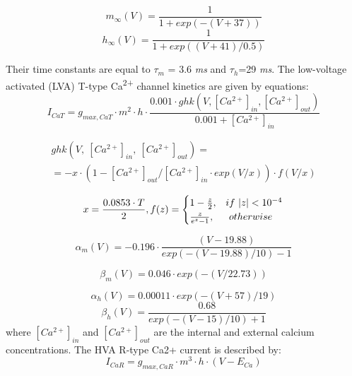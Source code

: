 \documentclass[a4paper,12pt]{article}
\begin{document}
\begin{equation}
m_{\infty}(V)=\frac {1}{1+exp(-(V+37))}
\end{equation}
\begin{equation}
h_{\infty}(V)=\frac {1}{1+exp( (V+41)/0.5)}
\end{equation}

Their time constants are equal to $\tau_m$ = 3.6 \textit{ms} and $\tau_h$=29 \textit{ms}. The low-voltage activated (LVA) T-type Ca\textsuperscript{2+} channel kinetics are given by equations:
\begin{equation}
I_{CaT} = g_{max, CaT}\cdot m^2\cdot h \cdot \frac{0.001 \cdot ghk(V,[Ca^{2+}]_{in},[Ca^{2+}]_{out})}{0.001+[Ca^{2+}]_{in} }
\end{equation}

\begin{eqnarray}
ghk(V,\ [Ca^{2+}]_{in},\ [Ca^{2+}]_{out}) = \nonumber \\
= -x\cdot (1 - [Ca^{2+}]_{out}/[Ca^{2+}]_{in} \cdot exp(V/x)) \cdot f(V/x)
\end{eqnarray}

\begin{equation}
x=\frac{0.0853\cdot T}{2}, \\
f(z) = \begin{cases} 1-\frac {z}{2}, & if \ |z|<10^{-4} \\ \frac z{e^z-1}, & \  otherwise \ \end{cases}
\end{equation}

\begin{equation}
\alpha_m(V)=-0.196\cdot \frac{(V-19.88)}{exp(-(V-19.88)/10)-1} 
\end{equation}

\begin{equation}
\beta_m(V) = 0.046\cdot exp(-(V/22.73))
\end{equation}

\begin{equation}
\alpha_h(V)= 0.00011\cdot exp(-(V+57)/19)
\end{equation}
\begin{equation}
\beta_h(V)=\frac {0.68}{exp(-(V-15)/10)+1}
\end{equation}
where $[Ca^{2+}]_{in}$ and $[Ca^{2+}]_{out}$ are the internal and external calcium concentrations. The HVA R-type Ca2+ current is described by:
\begin{equation}
I_{CaR} = g_{max, CaR}\cdot m^3\cdot h\cdot (V-E_{Ca})
\end{equation}
\end{document}
